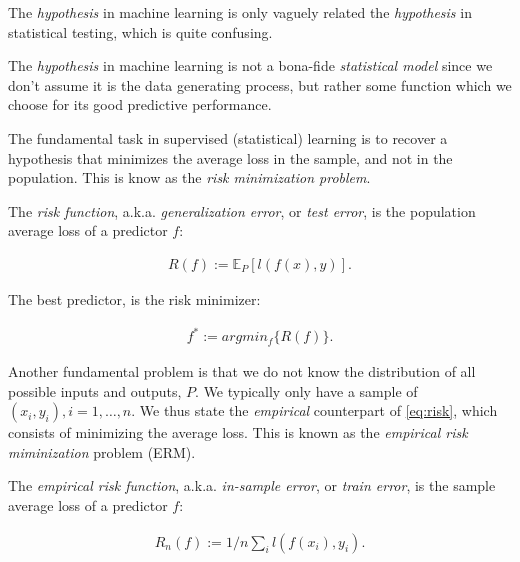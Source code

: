 \documentclass[]{book}
\theoremstyle{definition}
\theoremstyle{definition}
\theoremstyle{definition}
\theoremstyle{remark}
\let\BeginKnitrBlock\begin \let\EndKnitrBlock\end
\begin{document}
\BeginKnitrBlock{remark}
{}The \emph{hypothesis} in machine learning is
only vaguely related the \emph{hypothesis} in statistical testing, which
is quite confusing.
\EndKnitrBlock{remark}

\BeginKnitrBlock{remark}
{}The \emph{hypothesis} in machine learning is
not a bona-fide \emph{statistical model} since we don't assume it is the
data generating process, but rather some function which we choose for
its good predictive performance.
\EndKnitrBlock{remark}

The fundamental task in supervised (statistical) learning is to recover
a hypothesis that minimizes the average loss in the sample, and not in
the population. This is know as the \emph{risk minimization problem}.

\BeginKnitrBlock{definition}[Risk Function]
\protect\hypertarget{def:unnamed-chunk-236}{}{\label{def:unnamed-chunk-236}
{} }The \emph{risk function}, a.k.a.
\emph{generalization error}, or \emph{test error}, is the population
average loss of a predictor \(f\):

\begin{align}
  R(f):=\mathbb{E}_P[l(f(x),y)].
\end{align}
\EndKnitrBlock{definition}

The best predictor, is the risk minimizer:

\begin{align}
  f^* := argmin_f \{R(f)\}.
  \label{eq:risk}  
\end{align}

Another fundamental problem is that we do not know the distribution of
all possible inputs and outputs, \(P\). We typically only have a sample
of \((x_i,y_i), i=1,\dots,n\). We thus state the \emph{empirical}
counterpart of \eqref{eq:risk}, which consists of minimizing the average
loss. This is known as the \emph{empirical risk miminization} problem
(ERM).

\BeginKnitrBlock{definition}[Empirical Risk]
\protect\hypertarget{def:unnamed-chunk-237}{}{\label{def:unnamed-chunk-237}
{} }The \emph{empirical risk function},
a.k.a. \emph{in-sample error}, or \emph{train error}, is the sample
average loss of a predictor \(f\):

\begin{align}
  R_n(f):= 1/n \sum_i l(f(x_i),y_i).
\end{align}
\EndKnitrBlock{definition}
\end{document}
